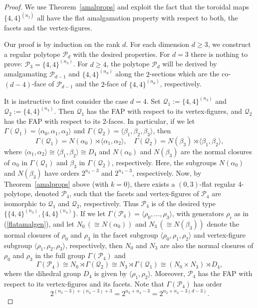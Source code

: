 \documentclass[12pt]{amsart}
\theoremstyle{definition}
\begin{document}
\begin{proof}
We use Theorem~\ref{amalprops} and exploit the fact that the toroidal maps $\{4,4\}^{(n_j)}$ all have the flat amalgamation property with respect to both, the facets and the vertex-figures. 

Our proof is by induction on the rank $d$. For each dimension $d\geq 3$, we construct a regular polytope ${\mathcal P}_d$ with the desired properties. For $d=3$ there is nothing to prove: ${\mathcal P}_{3}=\{4,4\}^{(n_3)}$. For $d\geq 4$, the polytope ${\mathcal P}_{d}$ will be derived by amalgamating ${\mathcal P}_{d-1}$ and $\{4,4\}^{(n_d)}$ along the $2$-sections which are the co-$(d-4)$-face of ${\mathcal P}_{d-1}$ and the $2$-face of $\{4,4\}^{(n_d)}$, respectively. 

It is instructive to first consider the case $d=4$. Set ${\mathcal Q}_1:=\{4,4\}^{(n_3)}$ and 
${\mathcal Q}_2:=\{4,4\}^{(n_4)}$. Then ${\mathcal Q}_1$ has the FAP with respect to its vertex-figures, and ${\mathcal Q}_2$ has the FAP with respect to its 2-faces. In particular, if we let $\Gamma(\mathcal{Q}_1)=\langle\alpha_0,\alpha_1,\alpha_2\rangle$ and $\Gamma(\mathcal{Q}_2)=\langle\beta_1,\beta_2,\beta_3\rangle$, then 
\[\Gamma(\mathcal{Q}_1)=N(\alpha_0)\rtimes\langle\alpha_1,\alpha_2\rangle,\quad
\Gamma(\mathcal{Q}_2)=N(\beta_3)\rtimes\langle\beta_1,\beta_2\rangle,\]
where $\langle\alpha_1,\alpha_2\rangle\cong\langle\beta_1,\beta_2\rangle\cong D_4$ and $N(\alpha_0)$ and $N(\beta_3)$ are the normal closures of $\alpha_0$ in 
$\Gamma(\mathcal{Q}_1)$ and $\beta_3$ in $\Gamma(\mathcal{Q}_2)$, respectively. Here, the subgroups $N(\alpha_0)$ and $N(\beta_3)$ have orders $2^{n_{3}-3}$ and $2^{n_{4}-3}$, respectively. Now, by Theorem~\ref{amalprops} above (with $k=0$), there exists a $(0,3)$-flat regular 4-polytope, denoted $\mathcal{P}_4$,  such that the facets and vertex-figures of ${\mathcal P}_4$ are isomorphic to ${\mathcal Q}_1$ and ${\mathcal Q}_2$, respectively. Thus ${\mathcal P}_4$ is of the desired type $\{\{4,4\}^{(n_3)},\{4,4\}^{(n_4)}\}$. If we let $\Gamma({\mathcal P}_4)=\langle\rho_0,\ldots,\rho_3\rangle$, with generators $\rho_i$ as in (\ref{flatamalgen}), and let $N_{0}\,(\cong N(\alpha_0))$ and $N_{3}\,(\cong N(\beta_3))$ denote the normal closures of $\rho_0$ and $\rho_3$ in the facet subgroup $\langle\rho_0,\rho_1,\rho_2\rangle$ and vertex-figure subgroup $\langle\rho_1,\rho_2,\rho_3\rangle$, respectively, then $N_{0}$ and $N_{3}$ are also the normal closures of $\rho_0$ and $\rho_3$ in the full group $\Gamma({\mathcal P}_4)$ and
\[\Gamma({\mathcal P}_4)
\cong N_0\rtimes\Gamma(\mathcal{Q}_2)
\cong N_3\rtimes\Gamma(\mathcal{Q}_1)
\cong (N_0\times N_3)\rtimes D_4 ,\]
where the dihedral group $D_4$ is given by $\langle\rho_1,\rho_2\rangle$. Moreover, ${\mathcal P}_4$ has the FAP with respect to its vertex-figures and its facets. Note that $\Gamma({\mathcal P}_4)$ has order
\[2^{(n_{3}-3)+(n_{4}-3)+3}=2^{n_3+n_4-3}=2^{n_3+n_4-3(d-3)}.\]


\end{proof}
\end{document}
